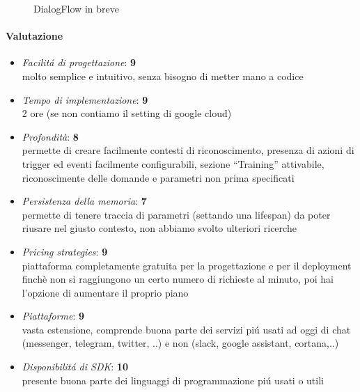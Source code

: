 \documentclass[]{article}
\begin{document}
\begin{figure}
\caption{ \footnotesize{DialogFlow in breve}}
\end{figure}

\paragraph{Valutazione}
\begin{itemize}
\item \textit{Facilitá di progettazione}: \textbf{9} \\ molto semplice e intuitivo, senza bisogno di metter mano a codice

\item \textit{Tempo di implementazione}: \textbf{9} \\ 2 ore (se non contiamo il setting di google cloud)  

\item \textit{Profondità}: \textbf{8} \\  permette di creare facilmente contesti di riconoscimento, presenza di azioni di trigger ed eventi facilmente configurabili, sezione “Training” attivabile, riconoscimente delle domande e parametri non prima specificati
\item \textit{Persistenza della memoria}: \textbf{7} \\ permette di tenere traccia di parametri (settando una lifespan) da poter riusare nel giusto contesto, non abbiamo svolto ulteriori ricerche
\item \textit{Pricing strategies}: \textbf{9} \\ piattaforma completamente gratuita per la progettazione e per il deployment finchè non si raggiungono un certo numero di richieste al minuto, poi hai l’opzione di aumentare il proprio piano

\item \textit{Piattaforme}: \textbf{9} \\ vasta estensione, comprende buona parte dei servizi piú usati ad oggi di chat (messenger, telegram, twitter, ..) e non (slack, google assistant, cortana,..) 
\item \textit{Disponibilitá di SDK}: \textbf{10} \\  presente buona parte dei linguaggi di programmazione piú usati o utili
\end{itemize}
\end{document}
